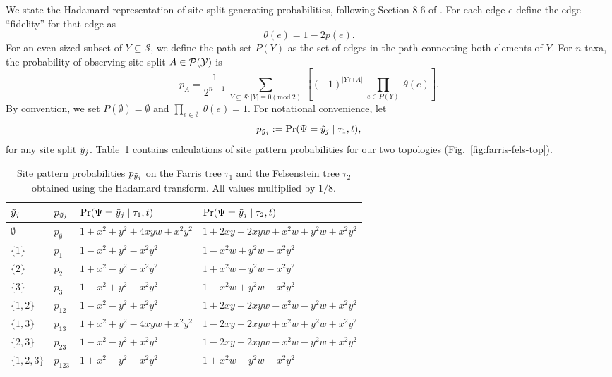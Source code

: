We state the Hadamard representation of site split generating probabilities, following Section 8.6 of \citet{Semple2003-em}.
For each edge $e$ define the edge ``fidelity'' for that edge as
$$
\theta(e) = 1-2p(e).
$$
For an even-sized subset of $Y\subseteq\mathcal{S}$, we define the path set $P(Y)$ as the set of edges in the path connecting both elements of $Y$.
For $n$ taxa, the probability of observing site split $A\in\mathcal{P}(\mathcal{Y})$ is
\begin{equation}
\label{eq:hadamard_probability}
p_A = \frac{1}{2^{n-1}} \ \sum_{Y \subseteq \mathcal{S} : |Y| \equiv 0 (\mathrm{mod} \ 2)} \ \left[(-1)^{|Y \cap A|} \ \prod_{e\in P(Y)} \ \theta(e) \right].
\end{equation}
By convention, we set $P(\emptyset)=\emptyset$ and $\prod_{e\in\emptyset} \ \theta(e) = 1$.
For notational convenience, let
$$
p_{\tilde{y}_j} := \Pr(\Psi=\tilde{y}_j \mid \tau_1,t),
$$
for any site split $\tilde{y}_j$.
Table~\ref{tab:sitepatprob} contains calculations of site pattern probabilities for our two topologies (Fig.~\ref{fig:farris-fels-top}).

\begin{table}[ht]
\centering
\begin{tabular}{|l|l|l|l|}
    \hline
$\tilde{y}_j$  & $p_{\tilde{y}_j}$ &$\Pr(\Psi=\tilde{y}_j \mid \tau_1,t)$&$\Pr(\Psi=\tilde{y}_j \mid \tau_2,t)$\\
    \hline
    $\emptyset$ & $p_{\emptyset}$   &$1+x^2+y^2+4xyw+x^2y^2$&$1+2xy+2xyw+x^2w+y^2w+x^2y^2$\\
    $\{1\}$     & $p_{1}$   &$1-x^2+y^2-x^2y^2$&$1-x^2w+y^2w-x^2y^2$\\
    $\{2\}$     & $p_{2}$   &$1+x^2-y^2-x^2y^2$&$1+x^2w-y^2w-x^2y^2$\\
    $\{3\}$     & $p_{3}$   &$1-x^2+y^2-x^2y^2$&$1-x^2w+y^2w-x^2y^2$\\
    $\{1,2\}$   & $p_{12}$   &$1-x^2-y^2+x^2y^2$&$1+2xy-2xyw-x^2w-y^2w+x^2y^2$\\
    $\{1,3\}$   & $p_{13}$   &$1+x^2+y^2-4xyw+x^2y^2$&$1-2xy-2xyw+x^2w+y^2w+x^2y^2$\\
    $\{2,3\}$   & $p_{23}$   &$1-x^2-y^2+x^2y^2$&$1-2xy+2xyw-x^2w-y^2w+x^2y^2$\\
    $\{1,2,3\}$ & $p_{123}$   &$1+x^2-y^2-x^2y^2$&$1+x^2w-y^2w-x^2y^2$\\
    \hline
\end{tabular}
\caption{Site pattern probabilities $p_{\tilde{y}_j}$ on the Farris tree $\tau_1$ and the Felsenstein tree $\tau_2$ obtained using the Hadamard transform.
All values multiplied by $1/8$.}
\label{tab:sitepatprob}
\end{table}

